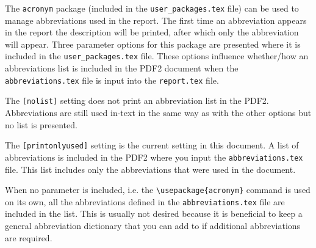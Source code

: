 \documentclass[a4paper, onecolumn, 12pt]{IEEEtran}
\begin{document}
The \verb|acronym| package (included in the \verb|user_packages.tex| file) can be used to manage abbreviations used in the report. The first time an abbreviation appears in the report the description will be printed, after which only the abbreviation will appear. Three parameter options for this package are presented where it is included in the \verb|user_packages.tex| file. These options influence whether/how an abbreviations list is included in the \ac{PDF2} document when the \verb|abbreviations.tex| file is input into the \verb|report.tex| file.

\begin{compactitem}
    \item The \verb|[nolist]| setting does not print an abbreviation list in the \ac{PDF2}. Abbreviations are still used in-text in the same way as with the other options but no list is presented.
    \item The \verb|[printonlyused]| setting is the current setting in this document. A list of abbreviations is included in the \ac{PDF2} where you input the \verb|abbreviations.tex| file. This list includes only the abbreviations that were used in the document.
    \item When no parameter is included, i.e. the \verb|\usepackage{acronym}| command is used on its own, all the abbreviations defined in the \verb|abbreviations.tex| file are included in the list. This is usually not desired because it is beneficial to keep a general abbreviation dictionary that you can add to if additional abbreviations are required.
\end{compactitem}
\end{document}
